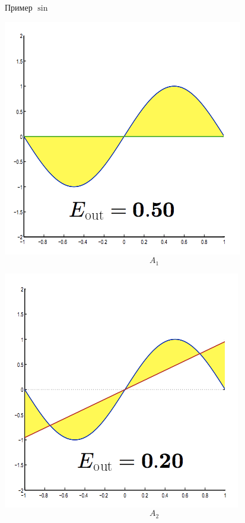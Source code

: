 \documentclass[10pt]{beamer}
\begin{document}
\begin{frame}{Пример $\sin$}
  \centering
  \begin{minipage}[b]{.45\textwidth}
    \includegraphics[width=\textwidth, keepaspectratio]{images/sin1} \\
    $$A_1$$
  \end{minipage}\qquad
  \pause
  \begin{minipage}[b]{.45\textwidth}
    \includegraphics[width=\textwidth, keepaspectratio]{images/sin11}
    $$A_2$$
  \end{minipage}
\end{frame}
\end{document}
